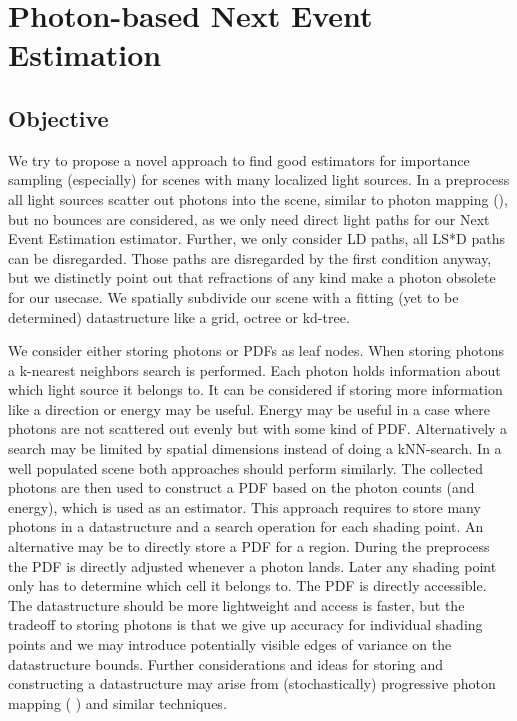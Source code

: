
\chapter{Photon-based Next Event Estimation}
\label{ch:PNEE}

\section{Objective}

We try to propose a novel approach to find good estimators for importance sampling (especially) for scenes with many localized light sources. In a preprocess all light sources scatter out photons into the scene, similar to photon mapping (\cite{jensen2001realistic}), but no bounces are considered, as we only need direct light paths for our Next Event Estimation estimator. Further, we only consider LD paths, all LS*D paths can be disregarded. Those paths are disregarded by the first condition anyway, but we distinctly point out that refractions of any kind make a photon obsolete for our usecase. We spatially subdivide our scene with a fitting (yet to be determined) datastructure like a grid, octree or kd-tree. 

We consider either storing photons or PDFs as leaf nodes. When storing photons a k-nearest neighbors search is performed. Each photon holds information about which light source it belongs to. It can be considered if storing more information like a direction or energy may be useful. Energy may be useful in a case where photons are not scattered out evenly but with some kind of PDF. Alternatively a search may be limited by spatial dimensions instead of doing a kNN-search. In a well populated scene both approaches should perform similarly. The collected photons are then used to construct a PDF based on the photon counts (and energy), which is used as an estimator. This approach requires to store many photons in a datastructure and a search operation for each shading point. An alternative may be to directly store a PDF for a region. During the preprocess the PDF is directly adjusted whenever a photon lands. Later any shading point only has to determine which cell it belongs to. The PDF is directly accessible. The datastructure should be more lightweight and access is faster, but the tradeoff to storing photons is that we give up accuracy for individual shading points and we may introduce potentially visible edges of variance on the datastructure bounds. Further considerations and ideas for storing and constructing a datastructure may arise from (stochastically) progressive photon mapping (\cite{Hachisuka2008ProgressivePM} \cite{Hachisuka2009StochasticPP}) and similar techniques.

